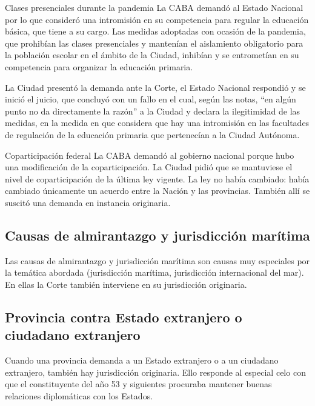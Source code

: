 \documentclass[12pt,oneside]{book}
\begin{document}
\begin{example}{Clases presenciales durante la pandemia}
La CABA demandó al Estado Nacional por lo que consideró una intromisión en su competencia para regular la educación básica, que tiene a su cargo. Las medidas adoptadas con ocasión de la pandemia, que prohibían las clases presenciales y mantenían el aislamiento obligatorio para la población escolar en el ámbito de la Ciudad, inhibían y se entrometían en su competencia para organizar la educación primaria.

La Ciudad presentó la demanda ante la Corte, el Estado Nacional respondió y se inició el juicio, que concluyó con un fallo en el cual, según las notas, ``en algún punto no da directamente la razón'' a la Ciudad y declara la ilegitimidad de las medidas, en la medida en que considera que hay una intromisión en las facultades de regulación de la educación primaria que pertenecían a la Ciudad Autónoma.
\end{example}

\begin{example}{Coparticipación federal}
La CABA demandó al gobierno nacional porque hubo una modificación de la coparticipación. La Ciudad pidió que se mantuviese el nivel de coparticipación de la última ley vigente. La ley no había cambiado: había cambiado únicamente un acuerdo entre la Nación y las provincias. También allí se suscitó una demanda en instancia originaria.
\end{example}

\subsection{Causas de almirantazgo y jurisdicción marítima}

Las causas de almirantazgo y jurisdicción marítima son causas muy especiales por la temática abordada (jurisdicción marítima, jurisdicción internacional del mar). En ellas la Corte también interviene en su jurisdicción originaria.

\subsection{Provincia contra Estado extranjero o ciudadano extranjero}

Cuando una provincia demanda a un Estado extranjero o a un ciudadano extranjero, también hay jurisdicción originaria. Ello responde al especial celo con que el constituyente del año 53 y siguientes procuraba mantener buenas relaciones diplomáticas con los Estados.
\end{document}
